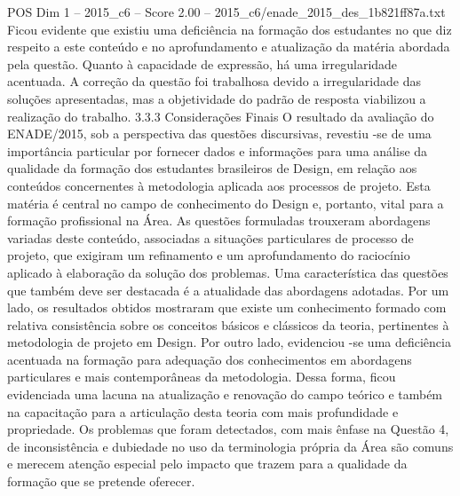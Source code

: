 \begin{textsample}{POS Dim 1 – 2015\_c6 – Score 2.00 – 2015\_c6/enade\_2015\_des\_1b821ff87a.txt}
Ficou evidente que existiu uma deficiência na formação dos estudantes no que diz respeito a este conteúdo e no aprofundamento e atualização da matéria abordada pela questão.
Quanto à capacidade de expressão, há uma irregularidade acentuada.
A correção da questão foi trabalhosa devido a irregularidade das soluções apresentadas, mas a objetividade do padrão de resposta viabilizou a realização do trabalho. 3.3.3 Considerações Finais O resultado da avaliação do ENADE/2015, sob a perspectiva das questões discursivas, revestiu -se de uma importância particular por fornecer dados e informações para uma análise da qualidade da formação dos estudantes brasileiros de Design, em relação aos conteúdos concernentes à metodologia aplicada aos processos de projeto.
Esta matéria é central no campo de conhecimento do Design e, portanto, vital para a formação profissional na Área.
As questões formuladas trouxeram abordagens variadas deste conteúdo, associadas a situações particulares de processo de projeto, que exigiram um refinamento e um aprofundamento do raciocínio aplicado à elaboração da solução dos problemas.
Uma característica das questões que também deve ser destacada é a atualidade das abordagens adotadas.
Por um lado, os resultados obtidos mostraram que existe um conhecimento formado com relativa consistência sobre os conceitos básicos e clássicos da teoria, pertinentes à metodologia de projeto em Design.
Por outro lado, evidenciou -se uma deficiência acentuada na formação para adequação dos conhecimentos em abordagens particulares e mais contemporâneas da metodologia.
Dessa forma, ficou evidenciada uma lacuna na atualização e renovação do campo teórico e também na capacitação para a articulação desta teoria com mais profundidade e propriedade.
Os problemas que foram detectados, com mais ênfase na Questão 4, de inconsistência e dubiedade no uso da terminologia própria da Área são comuns e merecem atenção especial pelo impacto que trazem para a qualidade da formação que se pretende oferecer.

\end{textsample}
